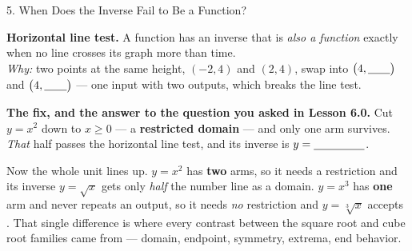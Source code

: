\documentclass[10pt]{article}
\begin{document}
\begin{notesbox}{5. When Does the Inverse Fail to Be a Function?}
\begin{center}
\begin{minipage}[c]{0.32\linewidth}
\end{minipage}
\end{center}
\vspace{2pt}
\begin{center}
\begin{tcolorbox}[colback=goldbg, colframe=goldacc, boxrule=0.8pt, arc=1.5mm, width=0.94\linewidth,
    left=3mm, right=3mm, top=2mm, bottom=2mm]
\small
\textbf{Horizontal line test.} A function has an inverse that is \emph{also a function} exactly when
no \blank{2.6cm} line crosses its graph more than \blank{1.2cm} time.
\\[3pt]
\emph{Why:} two points at the same height, $(-2,4)$ and $(2,4)$, swap into
$\big(4,\blank{0.7cm}\big)$ and $\big(4,\blank{0.7cm}\big)$ --- one input with two outputs, which
breaks the \blank{2.4cm} line test.
\end{tcolorbox}
\end{center}
\vspace{2pt}
\textbf{The fix, and the answer to the question you asked in Lesson 6.0.} Cut $y=x^{2}$ down to
$x\ge0$ --- a \textbf{restricted domain} --- and only one arm survives. \emph{That} half passes the
horizontal line test, and its inverse is $y=\blank{1.6cm}$.
\begin{center}
\begin{tcolorbox}[colback=forestbg, colframe=forest, boxrule=0.7pt, arc=1.5mm, width=0.94\linewidth,
    left=3mm, right=3mm, top=1.5mm, bottom=1.5mm]
\small
Now the whole unit lines up. $y=x^{2}$ has \textbf{two} arms, so it needs a restriction and its
inverse $y=\sqrt{x}$ gets only \emph{half} the number line as a domain. $y=x^{3}$ has
\textbf{one} arm and never repeats an output, so it needs \emph{no} restriction and
$y=\sqrt[3]{x}$ accepts \blank{2.6cm}. That single difference is where every contrast between the
square root and cube root families came from --- domain, endpoint, symmetry, extrema, end behavior.
\end{tcolorbox}
\end{center}
\end{notesbox}
\end{document}
